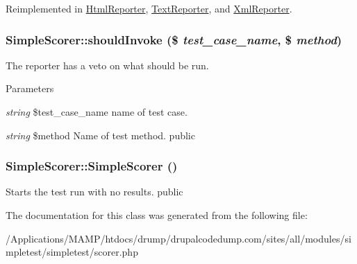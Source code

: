 Reimplemented in \hyperlink{class_html_reporter_a6414bae0e65badca0d33030bd281f884}{HtmlReporter}, \hyperlink{class_text_reporter_a3577d6c0e6e237592c2b37b79ff3d717}{TextReporter}, and \hyperlink{class_xml_reporter_acab5f1fd58264ba3efb725b9a52db405}{XmlReporter}.\hypertarget{class_simple_scorer_a8f0580062ffad69971b52c7e62bd8ad2}{
\subsubsection[{shouldInvoke}]{\setlength{\rightskip}{0pt plus 5cm}SimpleScorer::shouldInvoke (\$ {\em test\_\-case\_\-name}, \/  \$ {\em method})}}
\label{class_simple_scorer_a8f0580062ffad69971b52c7e62bd8ad2}
The reporter has a veto on what should be run. 
\begin{DoxyParams}{Parameters}
\item[{\em string}]\$test\_\-case\_\-name name of test case. \item[{\em string}]\$method Name of test method.  public \end{DoxyParams}
\hypertarget{class_simple_scorer_abe348a572a806ea640c69249318d800c}{
\subsubsection[{SimpleScorer}]{\setlength{\rightskip}{0pt plus 5cm}SimpleScorer::SimpleScorer ()}}
\label{class_simple_scorer_abe348a572a806ea640c69249318d800c}
Starts the test run with no results.  public 

The documentation for this class was generated from the following file:\begin{DoxyCompactItemize}
\item 
/Applications/MAMP/htdocs/drump/drupalcodedump.com/sites/all/modules/simpletest/simpletest/scorer.php\end{DoxyCompactItemize}

